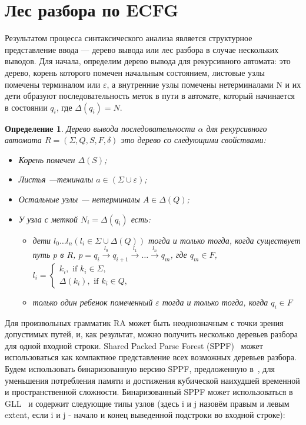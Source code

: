 \documentclass[12pt]{matmex-diploma-custom}
\newtheorem{mydef}{Определение}
\begin{document}
	\section{Лес разбора по ECFG}
	Результатом процесса синтаксического анализа является структурное представление 
	ввода --- дерево вывода или лес разбора в случае нескольких выводов.
	Для начала, определим дерево вывода для рекурсивного автомата: 
	это дерево, корень которого помечен начальным состоянием, листовые узлы помечены
	терминалом или $\varepsilon$, а внутренние узлы помечены нетерминалами N и их
	дети образуют последовательность меток в пути в автомате, который начинается в 
	состоянии $q_i$, где $ \Delta(q_i) = N $.
	
	\begin{mydef}
		
		Дерево вывода последовательности $\alpha$ для рекурсивного автомата $R=(\Sigma, Q, S, F, \delta)$ это дерево со следующими свойствами:
		
		\begin{itemize}
			\item Корень помечен $\Delta(S)$;
			\item Листья ---теминалы $a\in (\Sigma \cup \varepsilon)$;
			\item Остальные узлы --- нетерминалы $A\in \Delta(Q)$;
			\item У узла с меткой $N_i = \Delta(q_i)$ есть:
			\begin{itemize}
				\item 
				дети $l_0 \dots l_n (l_i \in \Sigma \cup \Delta(Q))$ тогда и только тогда,
				когда существует путь $p$ в $R$, $p = q_i \xrightarrow[]{l_0} q_{i+1} \xrightarrow[]{l_1} \dots \xrightarrow{l_n} q_m$, где
				$q_m \in F$, $l_i = 
				\left\{
				\begin{matrix}
				k_i, \text{ if }  k_i \in \Sigma,\\
				\Delta(k_i), \text{ if } k_i \in Q,
				\end{matrix}
				\right.
				$
				\item только один ребенок помеченный $\varepsilon$ тогда и только тогда,
				когда $ q_i \in F $
			\end{itemize}
		\end{itemize}
	\end{mydef}
	Для произвольных грамматик RA может быть неоднозначным с точки зрения допустимых путей,
	и, как результат, можно получить несколько деревьев разбора для одной входной строки.
	Shared Packed Parse Forest (SPPF)~\cite{SPPF} может использоваться как компактное
	представление всех возможных деревьев разбора. Будем использовать бинаризованную версию SPPF,
	предложенную в~\cite{brnglr}, для уменьшения потребления памяти и достижения кубической
	наихудшей временной и пространственной сложности. Бинаризованный SPPF может использоваться
	в GLL~\cite{scott2013gll} и содержит следующие типы узлов (здесь i и j назовём правым и
	левым extent, если i и j - начало и конец выведенной подстроки во входной строке):
	
\end{document}
